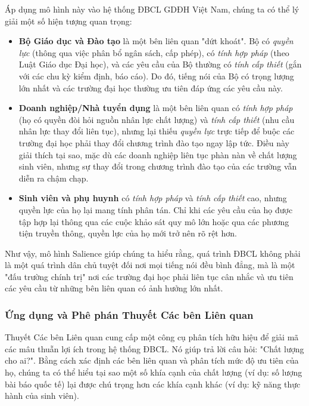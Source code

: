 \documentclass[12pt, a4paper, openany]{report}
\begin{document}
Áp dụng mô hình này vào hệ thống ĐBCL GDĐH Việt Nam, chúng ta có thể lý giải một số hiện tượng quan trọng:
\begin{itemize}
    \item \textbf{Bộ Giáo dục và Đào tạo} là một bên liên quan "dứt khoát". Bộ có \textit{quyền lực} (thông qua việc phân bổ ngân sách, cấp phép), có \textit{tính hợp pháp} (theo Luật Giáo dục Đại học), và các yêu cầu của Bộ thường có \textit{tính cấp thiết} (gắn với các chu kỳ kiểm định, báo cáo). Do đó, tiếng nói của Bộ có trọng lượng lớn nhất và các trường đại học thường ưu tiên đáp ứng các yêu cầu này.
    \item \textbf{Doanh nghiệp/Nhà tuyển dụng} là một bên liên quan có \textit{tính hợp pháp} (họ có quyền đòi hỏi nguồn nhân lực chất lượng) và \textit{tính cấp thiết} (nhu cầu nhân lực thay đổi liên tục), nhưng lại thiếu \textit{quyền lực} trực tiếp để buộc các trường đại học phải thay đổi chương trình đào tạo ngay lập tức. Điều này giải thích tại sao, mặc dù các doanh nghiệp liên tục phàn nàn về chất lượng sinh viên, nhưng sự thay đổi trong chương trình đào tạo của các trường vẫn diễn ra chậm chạp.
    \item \textbf{Sinh viên và phụ huynh} có \textit{tính hợp pháp} và \textit{tính cấp thiết} cao, nhưng quyền lực của họ lại mang tính phân tán. Chỉ khi các yêu cầu của họ được tập hợp lại thông qua các cuộc khảo sát quy mô lớn hoặc qua các phương tiện truyền thông, quyền lực của họ mới trở nên rõ rệt hơn.
\end{itemize}
Như vậy, mô hình Salience giúp chúng ta hiểu rằng, quá trình ĐBCL không phải là một quá trình dân chủ tuyệt đối nơi mọi tiếng nói đều bình đẳng, mà là một "đấu trường chính trị" nơi các trường đại học phải liên tục cân nhắc và ưu tiên các yêu cầu từ những bên liên quan có ảnh hưởng lớn nhất.

\subsubsection{Ứng dụng và Phê phán Thuyết Các bên Liên quan}

Thuyết Các bên Liên quan cung cấp một công cụ phân tích hữu hiệu để giải mã các mâu thuẫn lợi ích trong hệ thống ĐBCL. Nó giúp trả lời câu hỏi: "Chất lượng cho ai?". Bằng cách xác định các bên liên quan và phân tích mức độ ưu tiên của họ, chúng ta có thể hiểu tại sao một số khía cạnh của chất lượng (ví dụ: số lượng bài báo quốc tế) lại được chú trọng hơn các khía cạnh khác (ví dụ: kỹ năng thực hành của sinh viên).
\end{document}
